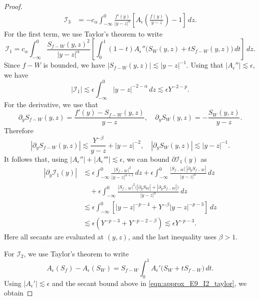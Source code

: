\documentclass[11pt]{amsart}
\theoremstyle{definition}
\theoremstyle{remark}
\numberwithin{equation}{section}
\newcommand{\mc}[1]{\mathcal{#1}}
\begin{document}
\begin{proof}
\begin{equation}
\begin{aligned}
            \mc{I}_3 & = -c_\alpha\int_{-\infty}^0\frac{f'(y)}{|y-z|^\alpha}\left[A_\epsilon\left(\frac{f(y)}{y-z}\right)-1\right]\,dz.
        \end{aligned}
    \end{equation}
    For the first term, we use Taylor's theorem to write
    \begin{equation}\label{eqn:approx_E9_I1_taylor}
        \mc{I}_1=c_\alpha\int_{-\infty}^0\frac{S_{f-W}(y,z)^2}{|y-z|^\alpha}\left[\int_0^1(1-t)A_\epsilon''\bigl(S_W(y,z)+tS_{f-W}(y,z)\bigr)\,dt\right]\,dz.
    \end{equation}
    Since $f - W$ is bounded, we have $|S_{f-W}(y,z)| \lesssim |y - z|^{-1}$. Using that $|A_{\epsilon}''| \lesssim \epsilon$, we have 
    \[|\mc{I}_1| \lesssim \epsilon\int_{-\infty}^{0}|y - z|^{-2 - \alpha} \, dz \lesssim \epsilon Y^{-2 - p}.\]
    For the derivative, we use that
    \[\partial_y S_{f - W}(y, z) = \frac{f'(y) - S_{f-W}(y,z)}{y - z}, \quad \partial_y S_W(y, z) = - \frac{S_{W}(y,z)}{y - z}.\]
    Therefore 
    \[|\partial_y S_{f - W}(y, z)| \lesssim \frac{Y^{-\beta}}{y - z} + |y - z|^{-2}, \quad |\partial_y S_W(y, z)| \lesssim |y - z|^{-1}.\]
    It follows that, using $|A_\epsilon''|+|A_\epsilon'''|\lesssim\epsilon$, we can bound $\partial \mc{I}_1(y)$ as
    \begin{align*}
        |\partial_y\mc{I}_1(y)|
        &\lesssim\epsilon\int_{-\infty}^0\frac{|S_{f-W}|^2}{|y-z|^{\alpha+1}}\,dz
        +\epsilon\int_{-\infty}^0\frac{|S_{f-W}|\,|\partial_yS_{f-W}|}{|y-z|^\alpha}\,dz\\
        &\quad+\epsilon\int_{-\infty}^0\frac{|S_{f-W}|^2\bigl(|\partial_yS_W|+|\partial_yS_{f-W}|\bigr)}{|y-z|^\alpha}\,dz\\
        &\lesssim\epsilon\int_{-\infty}^0\left[|y-z|^{-p-4}+Y^{-\beta}|y-z|^{-p-3}\right]\,dz\\
        &\lesssim\epsilon\left(Y^{-p-3}+Y^{-p-2-\beta}\right)
        \lesssim\epsilon Y^{-p-3}.
    \end{align*}
    Here all secants are evaluated at $(y,z)$, and the last inequality uses $\beta>1$. \par 
    For $\mc{I}_2$, we use Taylor's theorem to write
    \begin{equation}\label{eqn:approx_E9_I2_taylor}
        A_\epsilon(S_f)-A_\epsilon(S_W)
        =S_{f-W}\int_0^1A_\epsilon'\bigl(S_W+tS_{f-W}\bigr)\,dt.
    \end{equation}
    Using $|A_\epsilon'|\lesssim\epsilon$ and the secant bound above in \eqref{eqn:approx_E9_I2_taylor}, we obtain

\end{proof}
\end{document}
